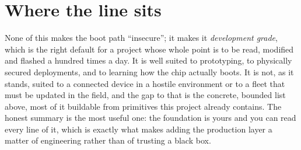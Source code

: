 \section{Where the line sits}

None of this makes the boot path ``insecure''; it makes it \emph{development
grade}, which is the right default for a project whose whole point is to be read,
modified and flashed a hundred times a day. It is well suited to prototyping, to
physically secured deployments, and to learning how the chip actually boots. It is
not, as it stands, suited to a connected device in a hostile environment or to a
fleet that must be updated in the field, and the gap to that is the concrete,
bounded list above, most of it buildable from primitives this project already
contains. The honest summary is the most useful one: the foundation is yours and
you can read every line of it, which is exactly what makes adding the production
layer a matter of engineering rather than of trusting a black box.
